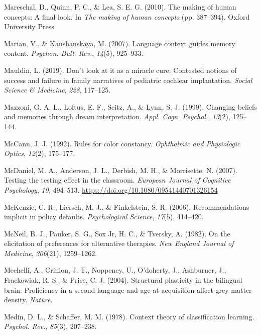 \documentclass[
]{krantz}
\newlength{\cslhangindent}
\newlength{\cslentryspacingunit} %
\newenvironment{CSLReferences}[2] %
 {%
  \setlength{\parindent}{0pt}
  \ifodd #1
  \let\oldpar\par
  \def\par{\hangindent=\cslhangindent\oldpar}
  \fi
  \setlength{\parskip}{#2\cslentryspacingunit}
 }%
 {}
\begin{document}
\begin{CSLReferences}{1}{0}
\leavevmode{}%
Mareschal, D., Quinn, P. C., \& Lea, S. E. G. (2010). The making of human concepts: A final look. In \emph{The making of human concepts} (pp. 387--394). Oxford University Press.

\leavevmode{}%
Marian, V., \& Kaushanskaya, M. (2007). Language context guides memory content. \emph{Psychon. Bull. Rev.}, \emph{14}(5), 925--933.

\leavevmode{}%
Mauldin, L. (2019). Don't look at it as a miracle cure: Contested notions of success and failure in family narratives of pediatric cochlear implantation. \emph{Social Science \& Medicine}, \emph{228}, 117--125.

\leavevmode{}%
Mazzoni, G. A. L., Loftus, E. F., Seitz, A., \& Lynn, S. J. (1999). Changing beliefs and memories through dream interpretation. \emph{Appl. Cogn. Psychol.}, \emph{13}(2), 125--144.

\leavevmode{}%
McCann, J. J. (1992). Rules for color constancy. \emph{Ophthalmic and Physiologic Optics}, \emph{12}(2), 175--177.

\leavevmode{}%
McDaniel, M. A., Anderson, J. L., Derbish, M. H., \& Morrisette, N. (2007). Testing the testing effect in the classroom. \emph{European Journal of Cognitive Psychology}, \emph{19}, 494--513. \url{https://doi.org/10.1080/09541440701326154}

\leavevmode{}%
McKenzie, C. R., Liersch, M. J., \& Finkelstein, S. R. (2006). Recommendations implicit in policy defaults. \emph{Psychological Science}, \emph{17}(5), 414--420.

\leavevmode{}%
McNeil, B. J., Pauker, S. G., Sox Jr, H. C., \& Tversky, A. (1982). On the elicitation of preferences for alternative therapies. \emph{New England Journal of Medicine}, \emph{306}(21), 1259--1262.

\leavevmode{}%
Mechelli, A., Crinion, J. T., Noppeney, U., O'doherty, J., Ashburner, J., Frackowiak, R. S., \& Price, C. J. (2004). Structural plasticity in the bilingual brain: Proficiency in a second language and age at acquisition affect grey-matter density. \emph{Nature}.

\leavevmode{}%
Medin, D. L., \& Schaffer, M. M. (1978). Context theory of classification learning. \emph{Psychol. Rev.}, \emph{85}(3), 207--238.


\end{CSLReferences}
\end{document}
